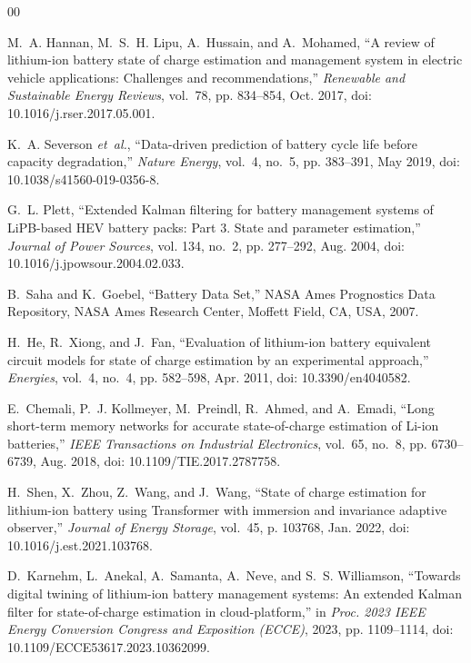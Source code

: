 \documentclass[conference]{IEEEtran}
\begin{document}
\begin{thebibliography}{00}

M.~A. Hannan, M.~S.~H. Lipu, A.~Hussain, and A.~Mohamed, ``A review of lithium-ion battery state of charge estimation and management system in electric vehicle applications: Challenges and recommendations,'' \emph{Renewable and Sustainable Energy Reviews}, vol.~78, pp. 834--854, Oct. 2017, doi: 10.1016/j.rser.2017.05.001.

K.~A. Severson \emph{et~al.}, ``Data-driven prediction of battery cycle life before capacity degradation,'' \emph{Nature Energy}, vol.~4, no.~5, pp. 383--391, May 2019, doi: 10.1038/s41560-019-0356-8.

G.~L. Plett, ``Extended Kalman filtering for battery management systems of LiPB-based HEV battery packs: Part 3. State and parameter estimation,'' \emph{Journal of Power Sources}, vol. 134, no.~2, pp. 277--292, Aug. 2004, doi: 10.1016/j.jpowsour.2004.02.033.

B.~Saha and K.~Goebel, ``Battery Data Set,'' NASA Ames Prognostics Data Repository, NASA Ames Research Center, Moffett Field, CA, USA, 2007.

H.~He, R.~Xiong, and J.~Fan, ``Evaluation of lithium-ion battery equivalent circuit models for state of charge estimation by an experimental approach,'' \emph{Energies}, vol.~4, no.~4, pp. 582--598, Apr. 2011, doi: 10.3390/en4040582.

E.~Chemali, P.~J. Kollmeyer, M.~Preindl, R.~Ahmed, and A.~Emadi, ``Long short-term memory networks for accurate state-of-charge estimation of Li-ion batteries,'' \emph{IEEE Transactions on Industrial Electronics}, vol.~65, no.~8, pp. 6730--6739, Aug. 2018, doi: 10.1109/TIE.2017.2787758.

H.~Shen, X.~Zhou, Z.~Wang, and J.~Wang, ``State of charge estimation for lithium-ion battery using Transformer with immersion and invariance adaptive observer,'' \emph{Journal of Energy Storage}, vol.~45, p. 103768, Jan. 2022, doi: 10.1016/j.est.2021.103768.

D.~Karnehm, L.~Anekal, A.~Samanta, A.~Neve, and S.~S. Williamson, ``Towards digital twining of lithium-ion battery management systems: An extended Kalman filter for state-of-charge estimation in cloud-platform,'' in \emph{Proc. 2023 IEEE Energy Conversion Congress and Exposition (ECCE)}, 2023, pp. 1109--1114, doi: 10.1109/ECCE53617.2023.10362099.


\end{thebibliography}
\end{document}
